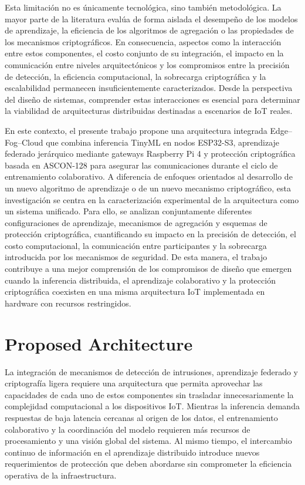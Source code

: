 \documentclass[journal,article,submit,moreauthors]{Definitions/mdpi}
\begin{document}
Esta limitación no es únicamente tecnológica, sino también metodológica. La mayor parte de la literatura evalúa de forma aislada el desempeño de los modelos de aprendizaje, la eficiencia de los algoritmos de agregación o las propiedades de los mecanismos criptográficos. En consecuencia, aspectos como la interacción entre estos componentes, el costo conjunto de su integración, el impacto en la comunicación entre niveles arquitectónicos y los compromisos entre la precisión de detección, la eficiencia computacional, la sobrecarga criptográfica y la escalabilidad permanecen insuficientemente caracterizados. Desde la perspectiva del diseño de sistemas, comprender estas interacciones es esencial para determinar la viabilidad de arquitecturas distribuidas destinadas a escenarios de IoT reales.
%

En este contexto, el presente trabajo propone una arquitectura integrada Edge--Fog--Cloud que combina inferencia TinyML en nodos ESP32-S3, aprendizaje federado jerárquico mediante gateways Raspberry Pi 4 y protección criptográfica basada en ASCON-128 para asegurar las comunicaciones durante el ciclo de entrenamiento colaborativo. A diferencia de enfoques orientados al desarrollo de un nuevo algoritmo de aprendizaje o de un nuevo mecanismo criptográfico, esta investigación se centra en la caracterización experimental de la arquitectura como un sistema unificado. Para ello, se analizan conjuntamente diferentes configuraciones de aprendizaje, mecanismos de agregación y esquemas de protección criptográfica, cuantificando su impacto en la precisión de detección, el costo computacional, la comunicación entre participantes y la sobrecarga introducida por los mecanismos de seguridad. De esta manera, el trabajo contribuye a una mejor comprensión de los compromisos de diseño que emergen cuando la inferencia distribuida, el aprendizaje colaborativo y la protección criptográfica coexisten en una misma arquitectura IoT implementada en hardware con recursos restringidos.

\section{Proposed Architecture}
\label{sec:architecture}

La integración de mecanismos de detección de intrusiones, aprendizaje federado y criptografía ligera requiere una arquitectura que permita aprovechar las capacidades de cada uno de estos componentes sin trasladar innecesariamente la complejidad computacional a los dispositivos IoT. Mientras la inferencia demanda respuestas de baja latencia cercanas al origen de los datos, el entrenamiento colaborativo y la coordinación del modelo requieren más recursos de procesamiento y una visión global del sistema. Al mismo tiempo, el intercambio continuo de información en el aprendizaje distribuido introduce nuevos requerimientos de protección que deben abordarse sin comprometer la eficiencia operativa de la infraestructura.
\end{document}
